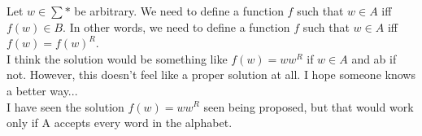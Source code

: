 \documentclass{article}
\begin{document}
Let $w \in \sum*$ be arbitrary. We need to define a function $f$ such that $w \in A$ iff $f(w) \in B$.
In other words, we need to define a function $f$ such that $w \in A$ iff $f(w) = f(w)^R$.\\
I think the solution would be something like $f(w) = ww^R$ if $w \in A$ and ab if not.
However, this doesn't feel like a proper solution at all. I hope someone knows a better way...\\
I have seen the solution $f(w) = ww^R$ seen being proposed, but that would work only if A accepts every word in the alphabet.
\end{document}
